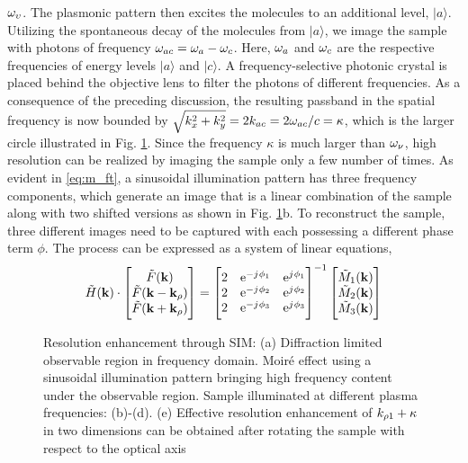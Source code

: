 $\omega_{\upsilon}$. The plasmonic pattern then excites the molecules to an
additional level, $|a\rangle$. Utilizing the spontaneous decay of the molecules from $|a\rangle$, we image the sample with photons of frequency $\omega_{ac} = \omega_{a}-\omega_{c}$. Here, $\omega_{a}$ and $\omega_{c}$ are the respective frequencies of energy levels $|a\rangle$ and $|c\rangle$. A frequency-selective photonic crystal is placed behind the objective lens to filter the photons of different frequencies. As a consequence of the preceding discussion, the resulting passband in the spatial frequency is now bounded by $\sqrt{k_x^2 + k_y^2} = 2 k_{ac} = 2 \omega_{ac}/c = \kappa$, which is the larger circle illustrated in Fig. \ref{fig:sim}. Since the frequency $\kappa$ is much larger than $\omega_{\nu}$, high resolution can be realized by imaging the sample only a few number of times.
%
As evident in \eqref{eq:m_ft}, a sinusoidal illumination pattern has three frequency components, which generate an image that is a linear combination of the sample along with two shifted versions as shown in Fig. \ref{fig:sim}b. To reconstruct the sample, three different images need to be captured with each possessing a different phase term $\phi$. The process can be expressed as a system of linear equations,
%
\begin{equation}
  \tilde{H}(\mathbf{k}) \cdot
  \begin{bmatrix}
    \tilde{F}(\mathbf{k}) \\
    \tilde{F}(\mathbf{k} - \mathbf{k}_{\rho}) \\
    \tilde{F}(\mathbf{k} + \mathbf{k}_{\rho})
  \end{bmatrix}
  =
  \begin{bmatrix}
    2 & \mathrm{e}^{-{j}\mkern1mu \phi_1} & \mathrm{e}^{{j}\mkern1mu \phi_1} \\
    2 & \mathrm{e}^{-{j}\mkern1mu \phi_2} & \mathrm{e}^{{j}\mkern1mu \phi_2} \\
    2 & \mathrm{e}^{-{j}\mkern1mu \phi_3} & \mathrm{e}^{{j}\mkern1mu \phi_3} \\
  \end{bmatrix}^{-1}
  \begin{bmatrix}
   \tilde{M}_1(\mathbf{k}) \\
   \tilde{M}_2(\mathbf{k}) \\
   \tilde{M}_3(\mathbf{k})
  \end{bmatrix}
  \label{eq:reconstruction_algo}
\end{equation}
%
\begin{figure}[t!]
  \centering
  \def\svgwidth{.75\linewidth}
  
  \caption{Resolution enhancement through SIM: (a) Diffraction limited observable region in frequency domain. Moiré effect using a sinusoidal illumination pattern bringing high frequency content under the observable region. Sample illuminated at different plasma frequencies: (b)-(d). (e) Effective resolution enhancement of $k_{\rho 1} + \kappa$ in two dimensions can be obtained after rotating the sample with respect to the optical axis}
  \label{fig:sim}
\end{figure}
